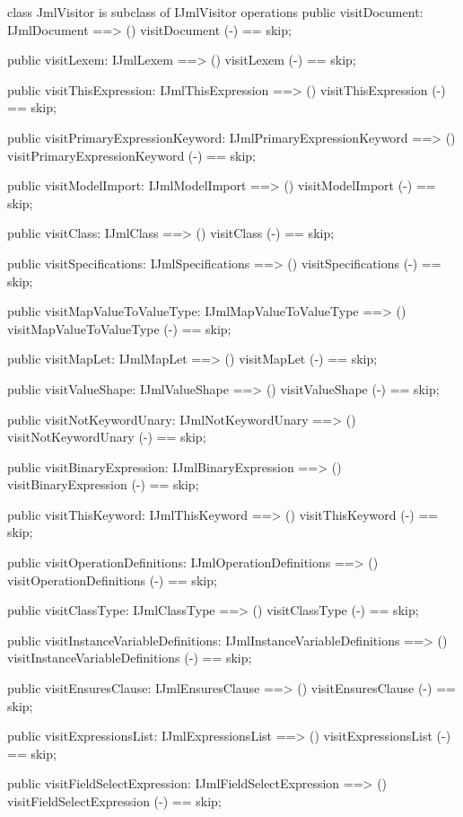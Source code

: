 \begin{vdm_al}
class JmlVisitor is subclass of IJmlVisitor
operations
  public visitDocument: IJmlDocument ==> ()
  visitDocument (-) == skip;

  public visitLexem: IJmlLexem ==> ()
  visitLexem (-) == skip;

  public visitThisExpression: IJmlThisExpression ==> ()
  visitThisExpression (-) == skip;

  public visitPrimaryExpressionKeyword: IJmlPrimaryExpressionKeyword ==> ()
  visitPrimaryExpressionKeyword (-) == skip;

  public visitModelImport: IJmlModelImport ==> ()
  visitModelImport (-) == skip;

  public visitClass: IJmlClass ==> ()
  visitClass (-) == skip;

  public visitSpecifications: IJmlSpecifications ==> ()
  visitSpecifications (-) == skip;

  public visitMapValueToValueType: IJmlMapValueToValueType ==> ()
  visitMapValueToValueType (-) == skip;

  public visitMapLet: IJmlMapLet ==> ()
  visitMapLet (-) == skip;

  public visitValueShape: IJmlValueShape ==> ()
  visitValueShape (-) == skip;

  public visitNotKeywordUnary: IJmlNotKeywordUnary ==> ()
  visitNotKeywordUnary (-) == skip;

  public visitBinaryExpression: IJmlBinaryExpression ==> ()
  visitBinaryExpression (-) == skip;

  public visitThisKeyword: IJmlThisKeyword ==> ()
  visitThisKeyword (-) == skip;

  public visitOperationDefinitions: IJmlOperationDefinitions ==> ()
  visitOperationDefinitions (-) == skip;

  public visitClassType: IJmlClassType ==> ()
  visitClassType (-) == skip;

  public visitInstanceVariableDefinitions: IJmlInstanceVariableDefinitions ==> ()
  visitInstanceVariableDefinitions (-) == skip;

  public visitEnsuresClause: IJmlEnsuresClause ==> ()
  visitEnsuresClause (-) == skip;

  public visitExpressionsList: IJmlExpressionsList ==> ()
  visitExpressionsList (-) == skip;

  public visitFieldSelectExpression: IJmlFieldSelectExpression ==> ()
  visitFieldSelectExpression (-) == skip;


\end{vdm_al}

